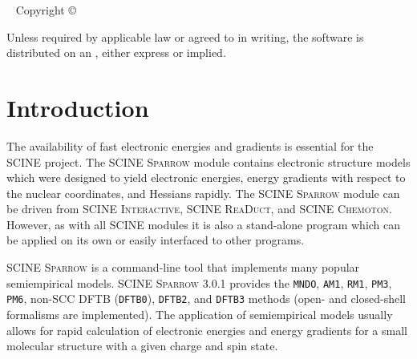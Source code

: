 \documentclass[]{tufte-book}
\title[SCINE Sparrow manual]{User Manual \vskip 0.5em {\setlength{\parindent}{0pt} \Huge SCINE Sparrow 3.0.1}}
\author[The SCINE Sparrow Developers]{The SCINE Sparrow Developers: \newline \noindent Francesco Bosia, Tamara Husch, Charlotte H.~M\"uller, Severin Polonius, Jan-Grimo Sobez, Miguel Steiner, Jan P.~Unsleber, Alain C.~Vaucher, Thomas Weymuth, and Markus Reiher}
\newcommand{\monthyear}{%
  \ifcase\month\or January\or February\or March\or April\or May\or June\or
  July\or August\or September\or October\or November\or
  December\fi\space\number\year
}
\begin{document}
\setlength{\parindent}{0pt}

\frontmatter


\maketitle


\newpage
\begin{fullwidth}
~\vfill
\thispagestyle{empty}
\setlength{\parindent}{0pt}
\setlength{\parskip}{\baselineskip}
Copyright \copyright\ \the\year\ \thanklessauthor


\par{}

\par Unless required by applicable law or agreed to in writing, the software 
is distributed on an , either express or implied. 

\end{fullwidth}

\tableofcontents




\mainmatter

\let\cleardoublepage\clearpage
\chapter{Introduction}

The availability of fast electronic energies and gradients is essential for the SCINE project. The SCINE \textsc{Sparrow} 
module contains electronic structure models which were designed to yield electronic energies, energy gradients with 
respect to the nuclear coordinates, and Hessians rapidly. The SCINE \textsc{Sparrow} module can be driven from SCINE 
\textsc{Interactive}, SCINE \textsc{ReaDuct}, and SCINE \textsc{Chemoton}. However, as with all SCINE modules it is also 
a stand-alone program which can be applied on its own or easily interfaced to other programs.

SCINE \textsc{Sparrow} is a command-line tool that implements many popular semiempirical models. SCINE \textsc{Sparrow} 3.0.1
provides the \texttt{MNDO}, \texttt{AM1}, \texttt{RM1}, \texttt{PM3}, \texttt{PM6}, non-SCC DFTB (\texttt{DFTB0}), \texttt{DFTB2}, and \texttt{DFTB3} methods 
(open- and closed-shell formalisms are implemented). 
The application of semiempirical models usually allows for rapid calculation of electronic energies and energy gradients 
for a small molecular structure with a given charge and spin state.
\end{document}
